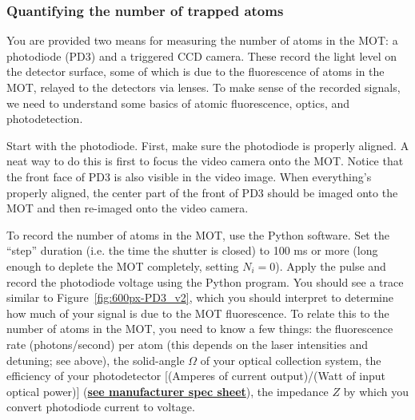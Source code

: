 \documentclass{../lab}
\begin{document}

\subsubsection{Quantifying the number of trapped atoms}

You are provided two means for measuring the number of atoms in the MOT: a photodiode (PD3) and a triggered CCD camera. These record the light level on the detector surface, some of which is due to the fluorescence of atoms in the MOT, relayed to the detectors via lenses. To make sense of the recorded signals, we need to understand some basics of atomic fluorescence, optics, and photodetection.

Start with the photodiode. First, make sure the photodiode is properly aligned. A neat way to do this is first to focus the video camera onto the MOT. Notice that the front face of PD3 is also visible in the video image. When everything's properly aligned, the center part of the front of PD3 should be imaged onto the MOT and then re-imaged onto the video camera.

To record the number of atoms in the MOT, use the Python software. Set the ``step'' duration (i.e. the time the shutter is closed) to 100 ms or more (long enough to deplete the MOT completely, setting $N_i = 0$). Apply the pulse and record the photodiode voltage using the Python program. You should see a trace similar to Figure~\ref{fig:600px-PD3_v2}, which you should interpret to determine how much of your signal is due to the MOT fluorescence. To relate this to the number of atoms in the MOT, you need to know a few things: the fluorescence rate (photons/second) per atom (this depends on the laser intensities and detuning; see above), the solid-angle $\Omega$ of your optical collection system, the efficiency of your photodetector [(Amperes of current output)/(Watt of input optical power)] (\href{https://berkeley-physics111b.github.io/assets/pdf/oldwebsitestructure/images/Photodiode\_info.pdf}{\textbf{see manufacturer spec sheet}}), the impedance $Z$ by which you convert photodiode current to voltage.
\end{document}

